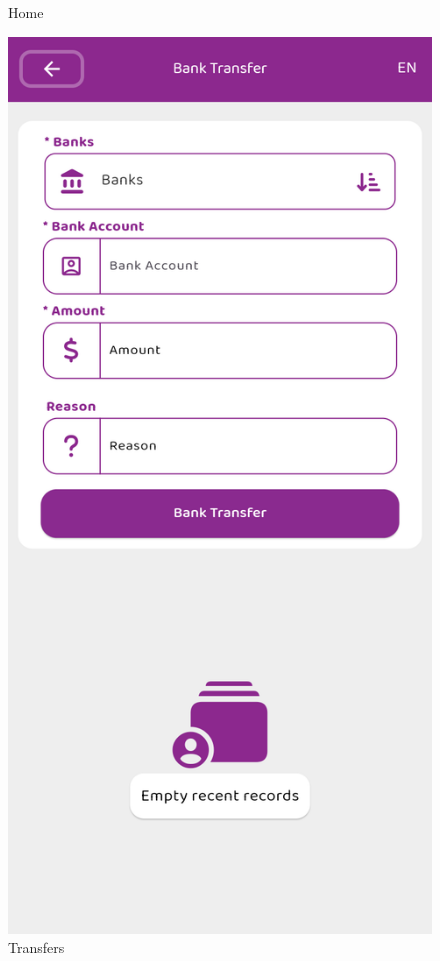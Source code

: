 \documentclass[a4paper,12pt]{report}
\begin{document}
\begin{figure}[h]
\begin{minipage}[b]{0.3\textwidth}
    \caption{Home}
  \end{minipage}
  \hfill
  \begin{minipage}[b]{0.3\textwidth}
    \includegraphics[width=\linewidth]{../images/screenshots/cbebirr/cbebirr_transfers.png}
    \caption{Transfers}
  \end{minipage}
\end{figure}
\end{document}

